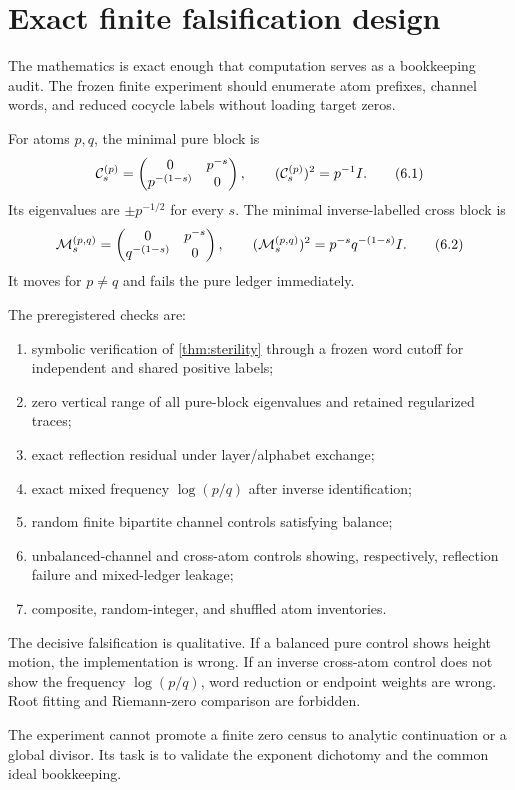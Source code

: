 \section{Exact finite falsification design}
\label{sec:experiment}

The mathematics is exact enough that computation serves as a bookkeeping
audit.  The frozen finite experiment should enumerate atom prefixes,
channel words, and reduced cocycle labels without loading target zeros.

For atoms $p,q$, the minimal pure block is
\[
 \mathcal C_s^{(p)}=
 \begin{pmatrix}0&p^{-s}\\p^{-(1-s)}&0\end{pmatrix},
 \qquad
 (\mathcal C_s^{(p)})^2=p^{-1}I.                   \tag{6.1}
\]
Its eigenvalues are $\pm p^{-1/2}$ for every $s$.  The minimal inverse-labelled
cross block is
\[
 \mathcal M_s^{(p,q)}=
 \begin{pmatrix}0&p^{-s}\\q^{-(1-s)}&0\end{pmatrix},
 \qquad
 (\mathcal M_s^{(p,q)})^2=p^{-s}q^{-(1-s)}I.       \tag{6.2}
\]
It moves for $p\ne q$ and fails the pure ledger immediately.

The preregistered checks are:
\begin{enumerate}
 \item symbolic verification of \cref{thm:sterility} through a frozen word
       cutoff for independent and shared positive labels;
 \item zero vertical range of all pure-block eigenvalues and retained
       regularized traces;
 \item exact reflection residual under layer/alphabet exchange;
 \item exact mixed frequency $\log(p/q)$ after inverse identification;
 \item random finite bipartite channel controls satisfying balance;
 \item unbalanced-channel and cross-atom controls showing, respectively,
       reflection failure and mixed-ledger leakage;
 \item composite, random-integer, and shuffled atom inventories.
\end{enumerate}

The decisive falsification is qualitative.  If a balanced pure control shows
height motion, the implementation is wrong.  If an inverse cross-atom control
does not show the frequency $\log(p/q)$, word reduction or endpoint weights
are wrong.  Root fitting and Riemann-zero comparison are forbidden.

The experiment cannot promote a finite zero census to analytic continuation
or a global divisor.  Its task is to validate the exponent dichotomy and the
common ideal bookkeeping.
